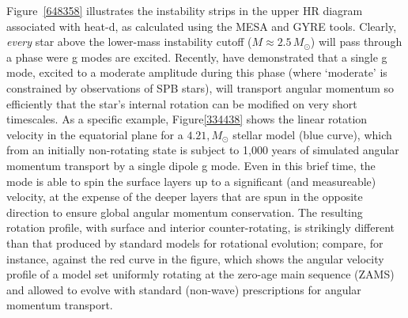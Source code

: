 Figure~\ref{648358} illustrates the instability strips in the upper HR diagram associated with heat-d, as calculated using the MESA and GYRE tools. Clearly, \emph{every} star above the lower-mass instability cutoff ($M \approx 2.5\,M_{\odot}$) will pass through a phase were g modes are excited. Recently, \citet{Townsend:2017} have demonstrated that a single g mode, excited to a moderate amplitude during this phase (where `moderate' is constrained by observations of SPB stars), will transport angular momentum so efficiently that the star's internal rotation can be modified on very short timescales. As a specific example, Figure\ref{334438} shows the linear rotation velocity in the equatorial plane for a $4.21,M_{\odot}$ stellar model (blue curve), which from an initially non-rotating state is subject to 1,000 years of simulated angular momentum transport by a single dipole g mode. Even in this brief time, the mode is able to spin the surface layers up to a significant (and measureable) velocity, at the expense of the deeper layers that are spun in the opposite direction to ensure global angular momentum conservation. The resulting rotation profile, with surface and interior counter-rotating, is strikingly different than that produced by standard models for rotational evolution; compare, for instance, against the red curve in the figure, which shows the angular velocity profile of a model set uniformly rotating at the zero-age main sequence (ZAMS) and allowed to evolve with standard (non-wave) prescriptions for angular momentum transport.


